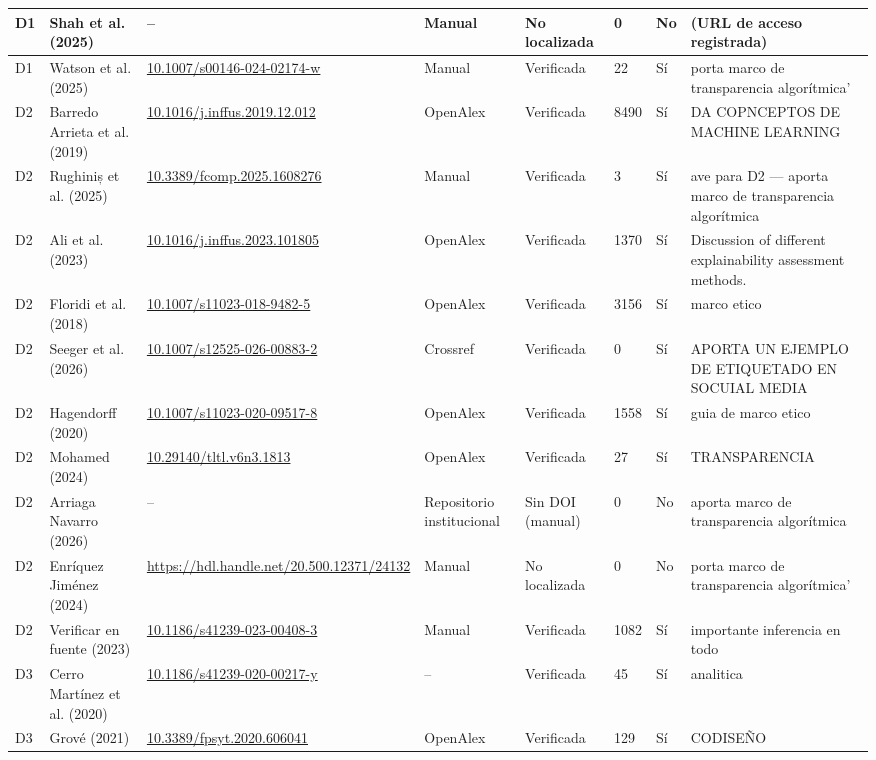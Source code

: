 {\begin{longtable}{|p{0.55cm}|p{2.6cm}|p{2.8cm}|p{1.3cm}|p{1.6cm}|p{0.8cm}|p{0.45cm}|p{2.4cm}|}
\hline
D1 & Shah et al. (2025) & {\scriptsize --} & Manual & No localizada & 0 & No & (URL de acceso registrada) \\
\hline
D1 & Watson et al. (2025) & {\scriptsize \url{10.1007/s00146-024-02174-w}} & Manual & Verificada & 22 & Sí & porta marco de transparencia algorítmica' \\
\hline
D2 & Barredo Arrieta et al. (2019) & {\scriptsize \url{10.1016/j.inffus.2019.12.012}} & OpenAlex & Verificada & 8490 & Sí & DA COPNCEPTOS DE MACHINE LEARNING \\
\hline
D2 & Rughiniș et al. (2025) & {\scriptsize \url{10.3389/fcomp.2025.1608276}} & Manual & Verificada & 3 & Sí & ave para D2 — aporta marco de transparencia algorítmica \\
\hline
D2 & Ali et al. (2023) & {\scriptsize \url{10.1016/j.inffus.2023.101805}} & OpenAlex & Verificada & 1370 & Sí & Discussion of different explainability assessment methods. \\
\hline
D2 & Floridi et al. (2018) & {\scriptsize \url{10.1007/s11023-018-9482-5}} & OpenAlex & Verificada & 3156 & Sí & marco etico \\
\hline
D2 & Seeger et al. (2026) & {\scriptsize \url{10.1007/s12525-026-00883-2}} & Crossref & Verificada & 0 & Sí & APORTA UN EJEMPLO DE ETIQUETADO  EN SOCUIAL MEDIA \\
\hline
D2 & Hagendorff (2020) & {\scriptsize \url{10.1007/s11023-020-09517-8}} & OpenAlex & Verificada & 1558 & Sí & guia de marco etico \\
\hline
D2 & Mohamed (2024) & {\scriptsize \url{10.29140/tltl.v6n3.1813}} & OpenAlex & Verificada & 27 & Sí & TRANSPARENCIA \\
\hline
D2 & Arriaga Navarro (2026) & {\scriptsize --} & Repositorio institucional & Sin DOI (manual) & 0 & No & aporta marco de transparencia algorítmica \\
\hline
D2 & Enríquez Jiménez (2024) & {\scriptsize \url{https://hdl.handle.net/20.500.12371/24132}} & Manual & No localizada & 0 & No & porta marco de transparencia algorítmica' \\
\hline
D2 & Verificar en fuente (2023) & {\scriptsize \url{10.1186/s41239-023-00408-3}} & Manual & Verificada & 1082 & Sí & importante inferencia en todo \\
\hline
D3 & Cerro Martínez et al. (2020) & {\scriptsize \url{10.1186/s41239-020-00217-y}} & -- & Verificada & 45 & Sí & analitica \\
\hline
D3 & Grové (2021) & {\scriptsize \url{10.3389/fpsyt.2020.606041}} & OpenAlex & Verificada & 129 & Sí & CODISEÑO \\

\end{longtable}}
